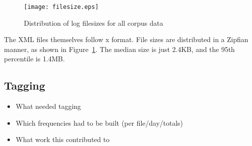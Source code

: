 \begin{figure}[h]
    \centering
    \texttt{[image: filesize.eps]}
    \caption{Distribution of log filesizes for all corpus data}
    \label{fig:filesizes}
\end{figure}



The XML files themselves follow x format. File sizes are distributed in a Zipfian manner, as shown in Figure~\ref{fig:filesizes}. The median size is just 2.4KB, and the 95th percentile is 1.4MB.




\subsection{Tagging}
\begin{itemize}
    \item What needed tagging
    \item Which frequencies had to be built (per file/day/totals)
    \item What work this contributed to
\end{itemize}
